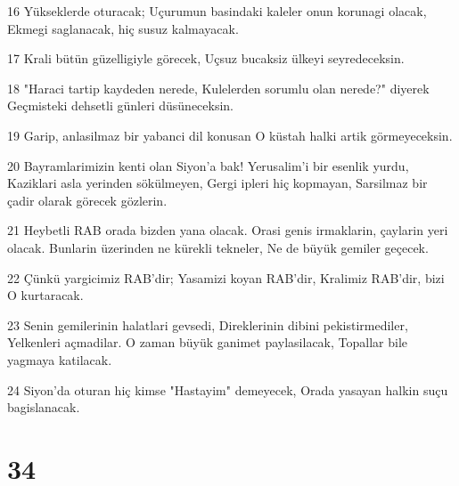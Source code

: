\par 16 Yükseklerde oturacak; Uçurumun basindaki kaleler onun korunagi olacak, Ekmegi saglanacak, hiç susuz kalmayacak.
\par 17 Krali bütün güzelligiyle görecek, Uçsuz bucaksiz ülkeyi seyredeceksin.
\par 18 "Haraci tartip kaydeden nerede, Kulelerden sorumlu olan nerede?" diyerek Geçmisteki dehsetli günleri düsüneceksin.
\par 19 Garip, anlasilmaz bir yabanci dil konusan O küstah halki artik görmeyeceksin.
\par 20 Bayramlarimizin kenti olan Siyon'a bak! Yerusalim'i bir esenlik yurdu, Kaziklari asla yerinden sökülmeyen, Gergi ipleri hiç kopmayan, Sarsilmaz bir çadir olarak görecek gözlerin.
\par 21 Heybetli RAB orada bizden yana olacak. Orasi genis irmaklarin, çaylarin yeri olacak. Bunlarin üzerinden ne kürekli tekneler, Ne de büyük gemiler geçecek.
\par 22 Çünkü yargicimiz RAB'dir; Yasamizi koyan RAB'dir, Kralimiz RAB'dir, bizi O kurtaracak.
\par 23 Senin gemilerinin halatlari gevsedi, Direklerinin dibini pekistirmediler, Yelkenleri açmadilar. O zaman büyük ganimet paylasilacak, Topallar bile yagmaya katilacak.
\par 24 Siyon'da oturan hiç kimse "Hastayim" demeyecek, Orada yasayan halkin suçu bagislanacak.

\chapter{34}

